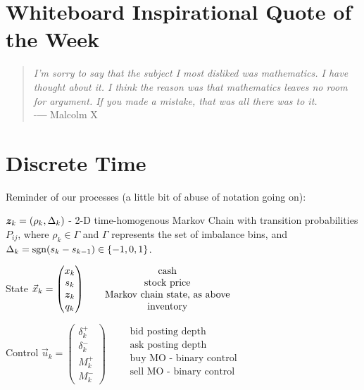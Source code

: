 \section{Whiteboard Inspirational Quote of the Week}
\begin{quote}
\textit{I'm sorry to say that the subject I most disliked was mathematics. I have thought about it. I think the reason was that mathematics leaves no room for argument. If you made a mistake, that was all there was to it.} \\-― Malcolm X 
\end{quote} 

\section{Discrete Time}
Reminder of our processes (a little bit of abuse of notation going on):

$\bm{z}_k = (\rho_k, \Delta_k)$ - 2-D time-homogenous Markov Chain with transition probabilities $P_{ij}$, where $\rho_k \in \Gamma$ and $\Gamma$ represents the set of imbalance bins, and $\Delta_k = \operatorname{\mathrm{sgn}}(s_k - s_{k-1}) \in \{-1,0,1\}$.

State $\vec{x}_{k} = \begin{pmatrix}
x_k \\
s_k \\
\bm{z}_k \\
q_k 
\end{pmatrix} \qquad \begin{matrix}
\text{cash} \\
\text{stock price} \\
\text{Markov chain state, as above} \\
\text{inventory} \\
\end{matrix}$

Control $\vec{u}_{k} = \begin{pmatrix}
\delta_k^+ \\
\delta_k^- \\
M_k^+ \\
M_k^-
\end{pmatrix} \qquad \begin{matrix}
\text{bid posting depth} \\
\text{ask posting depth} \\
\text{buy MO - binary control} \\
\text{sell MO - binary control} \\
\end{matrix}$

